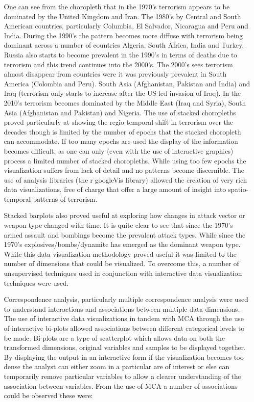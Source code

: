 One can see from the choropleth that in the 1970’s terrorism appears to be dominated by the United Kingdom and Iran. The 1980’s  by Central and South American countries, particularly Columbia, El Salvador, Nicaragua and Peru and India. During the 1990’s the pattern becomes more diffuse with terrorism being dominant across a number of countries Algeria, South Africa, India and Turkey. Russia also starts to become prevalent in the 1990’s in terms of deaths due to terrorism and this trend continues into the 2000’s. The 2000’s sees terrorism almost disappear from countries were it was previously prevalent in South America (Colombia and Peru). South Asia (Afghanistan, Pakistan and India) and Iraq (terrorism only starts to increase after the US led invasion of Iraq). In the 2010’s terrorism becomes dominated by the Middle East (Iraq and Syria), South Asia (Afghanistan and Pakistan) and Nigeria. The use of stacked choropleths proved particularly at showing the regio-temporal shift in terrorism over the decades though is limited by the number of epochs that the stacked choropleth can accommodate. If too many epochs are used the display of the information becomes difficult, as one can only (even with the use of interactive graphics) process a limited number of stacked choropleths. While using too few epochs the visualization suffers from lack of detail and no patterns become discernible. The use of analysis libraries (the r googleVis library) allowed the creation of very rich data visualizations, free of charge that offer a large amount of insight into spatio-temporal patterns of terrorism.

Stacked barplots also proved useful at exploring how changes in attack vector or weapon type changed with time. It is quite clear to see that since the 1970’s armed assault and bombings become the prevalent attack types. While since the 1970’s explosives/bombs/dynamite has emerged as the dominant weapon type.  While this data visualization methodology proved useful it was limited to the number of dimensions that could be visualized. To overcome this, a number of unsupervised techniques used in conjunction with interactive data visualization techniques were used. 

Correspondence analysis, particularly multiple correspondence analysis were used to understand interactions and associations between multiple data dimensions. The use of interactive data visualizations in tandem with MCA through the use of interactive bi-plots allowed associations between different categorical levels to be made. Bi-plots are a type of scatterplot which allows data on both the transformed dimensions,  original variables and samples to be displayed together. By displaying the output in an interactive form if the visualization becomes too dense the analyst can either zoom in a particular are of interest or else can temporarily remove particular variables to allow a clearer understanding of the association between variables. From the use of MCA a number of associations could be observed these were:

